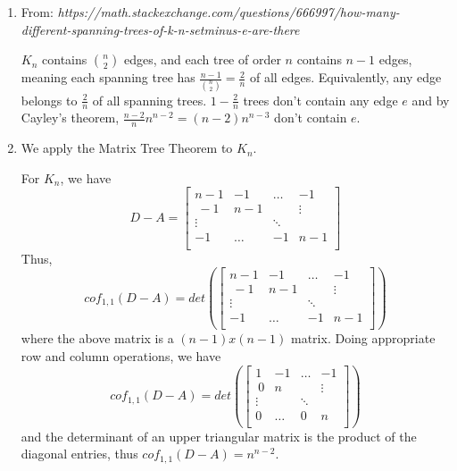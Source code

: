 \documentclass[11pt]{article}
\begin{document}
\begin{enumerate}[1]
    \item %
        From: \textit{https://math.stackexchange.com/questions/666997/how-many-
        \newline different-spanning-trees-of-k-n-setminus-e-are-there}

        $K_n$ contains $\binom{n}{2}$ edges, and each tree of order $n$ contains
        $n - 1$ edges, meaning each spanning tree has $\frac{n - 1}{
        \binom{n}{2}} = \frac{2}{n}$ of all edges. Equivalently, any edge belongs
        to $\frac{2}{n}$ of all spanning trees. $1 - \frac{2}{n}$ trees don't 
        contain any edge $e$ and by Cayley's theorem, $\frac{n-2}{n}n^{n-2} 
        = (n-2)n^{n-3}$ don't contain $e$. 

    \item %
        We apply the Matrix Tree Theorem to $K_n$.

        For $K_n$, we have 
        \[
            D - A = \begin{bmatrix}
                    n-1 & - 1 & \dots & -1 \\\
                    -1 & n-1 & & \vdots\\
                    \vdots & & \ddots & \\
                    -1 & \dots & -1 & n-1 \\
                    \end{bmatrix}
        \]
        Thus,
        \[
            cof_{1,1}(D - A) = det(\begin{bmatrix}
                    n-1 & - 1 & \dots & -1 \\\
                    -1 & n-1 & & \vdots\\
                    \vdots & & \ddots & \\
                    -1 & \dots & -1 & n-1 \\
                \end{bmatrix})
        \]
        where the above matrix is a $(n-1) x (n-1)$ matrix. Doing appropriate
        row and column operations, we have 
        \[
            cof_{1,1}(D - A) = det(\begin{bmatrix}
                    1 & - 1 & \dots & -1 \\\
                    0 & n &  & \vdots\\
                    \vdots &  & \ddots & \\
                    0 & \dots & 0 & n \\
                \end{bmatrix})
        \]
        and the determinant of an upper triangular matrix is the product of 
        the diagonal entries, thus $cof_{1,1}(D - A) = n^{n-2}$. 
        

\end{enumerate}
\end{document}
